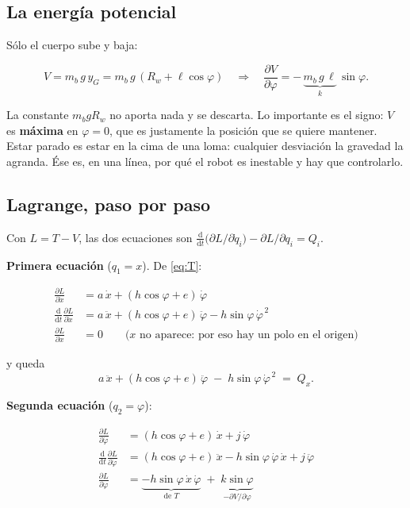 \documentclass[11pt,a4paper]{report}
\newcommand{\dd}{\mathrm{d}}
\begin{document}
\subsection{La energía potencial}

Sólo el cuerpo sube y baja:

\begin{equation}
V = m_b\,g\,y_G = m_b\,g\,(R_w + \ell\cos\varphi)
\quad\Longrightarrow\quad
\frac{\partial V}{\partial \varphi} = -\,\underbrace{m_b\,g\,\ell}_{k}\,\sin\varphi .
\end{equation}

La constante $m_b g R_w$ no aporta nada y se descarta. Lo importante es el signo: $V$ es
\textbf{máxima} en $\varphi = 0$, que es justamente la posición que se quiere mantener. Estar
parado es estar en la cima de una loma: cualquier desviación la gravedad la agranda. Ése es,
en una línea, por qué el robot es inestable y hay que controlarlo.

\subsection{Lagrange, paso por paso}

Con $L = T - V$, las dos ecuaciones son
$\frac{\dd}{\dd t}\bigl(\partial L/\partial \dot q_i\bigr) - \partial L/\partial q_i = Q_i$.

\textbf{Primera ecuación} ($q_1 = x$). De \eqref{eq:T}:

\begin{align}
\frac{\partial L}{\partial \dot x} &= a\,\dot x + (h\cos\varphi + e)\,\dot\varphi \\
\frac{\dd}{\dd t}\frac{\partial L}{\partial \dot x}
  &= a\,\ddot x + (h\cos\varphi + e)\,\ddot\varphi - h\sin\varphi\,\dot\varphi^{\,2} \\
\frac{\partial L}{\partial x} &= 0 \qquad\text{($x$ no aparece: por eso hay un polo en el origen)}
\end{align}

y queda
\begin{equation}\label{eq:fila1}
a\,\ddot x + (h\cos\varphi + e)\,\ddot\varphi \;-\; h\sin\varphi\,\dot\varphi^{\,2} \;=\; Q_x .
\end{equation}

\textbf{Segunda ecuación} ($q_2 = \varphi$):

\begin{align}
\frac{\partial L}{\partial \dot\varphi} &= (h\cos\varphi + e)\,\dot x + j\,\dot\varphi \\
\frac{\dd}{\dd t}\frac{\partial L}{\partial \dot\varphi}
  &= (h\cos\varphi + e)\,\ddot x - h\sin\varphi\,\dot\varphi\,\dot x + j\,\ddot\varphi \\
\frac{\partial L}{\partial \varphi}
  &= \underbrace{-h\sin\varphi\,\dot x\,\dot\varphi}_{\text{de }T}
   \;+\; \underbrace{k\sin\varphi}_{-\partial V/\partial\varphi}
\end{align}
\end{document}
